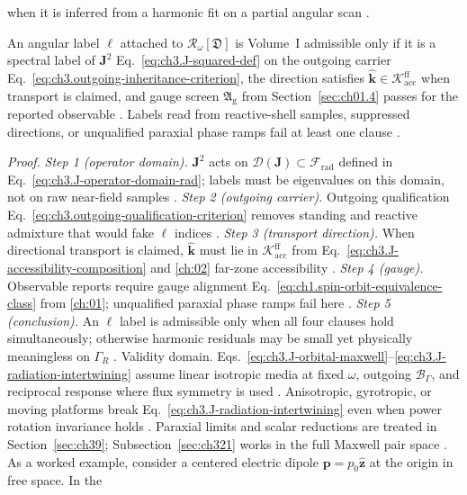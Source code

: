 when it is inferred from a harmonic fit on a partial angular scan \cite{hansen1988}.
\begin{theorem}
\label{thm:ch3.J-labeling-admissibility}
An angular label \(\ell\) attached to \(\mathcal{R}_\omega[\mathfrak{D}]\) is Volume~I admissible only if
it is a spectral label of \(\mathbf{J}^{2}\) Eq.~\eqref{eq:ch3.J-squared-def} on the outgoing carrier
Eq.~\eqref{eq:ch3.outgoing-inheritance-criterion}, the direction satisfies
\(\widehat{\mathbf{k}}\in\mathcal{K}_{\mathrm{acc}}^{\mathrm{ff}}\) when transport is claimed, and gauge
screen \(\mathfrak{A}_{\mathrm{g}}\) from Section~\ref{sec:ch01.4} passes for the reported observable
\cite{belinfante1940}. Labels read from reactive-shell samples, suppressed
directions, or unqualified paraxial phase ramps fail at least one clause \cite{allen1992}.
\end{theorem}
\noindent\textit{Proof.}
\emph{Step 1 (operator domain).} \(\mathbf{J}^{2}\) acts on \(\mathcal{D}(\mathbf{J})\subset\mathcal{F}_{\mathrm{rad}}\) defined in Eq.~\eqref{eq:ch3.J-operator-domain-rad}; labels must be eigenvalues on this domain, not on raw near-field samples .
\emph{Step 2 (outgoing carrier).} Outgoing qualification Eq.~\eqref{eq:ch3.outgoing-qualification-criterion} removes standing and reactive admixture that would fake \(\ell\) indices .
\emph{Step 3 (transport direction).} When directional transport is claimed, \(\widehat{\mathbf{k}}\) must lie in \(\mathcal{K}_{\mathrm{acc}}^{\mathrm{ff}}\) from Eq.~\eqref{eq:ch3.J-accessibility-composition} and \ref{ch:02} far-zone accessibility .
\emph{Step 4 (gauge).} Observable reports require gauge alignment Eq.~\eqref{eq:ch1.spin-orbit-equivalence-class} from \ref{ch:01}; unqualified paraxial phase ramps fail here .
\emph{Step 5 (conclusion).} An \(\ell\) label is admissible only when all four clauses hold simultaneously; otherwise harmonic residuals may be small yet physically meaningless on \(\Gamma_R\) .
Validity domain. Eqs.~\eqref{eq:ch3.J-orbital-maxwell}--\eqref{eq:ch3.J-radiation-intertwining} assume linear isotropic
media at fixed \(\omega\), outgoing \(\mathcal{B}_\Gamma\), and reciprocal response where flux symmetry is used
. Anisotropic, gyrotropic, or moving platforms break
Eq.~\eqref{eq:ch3.J-radiation-intertwining} even when power rotation invariance holds
. Paraxial limits and scalar reductions are treated in Section~\ref{sec:ch39};
Subsection~\ref{sec:ch321} works in the full Maxwell pair space .
As a worked example, consider a centered electric dipole \(\mathbf{p}=p_{0}\hat{\mathbf{z}}\) at the origin in free space. In the
